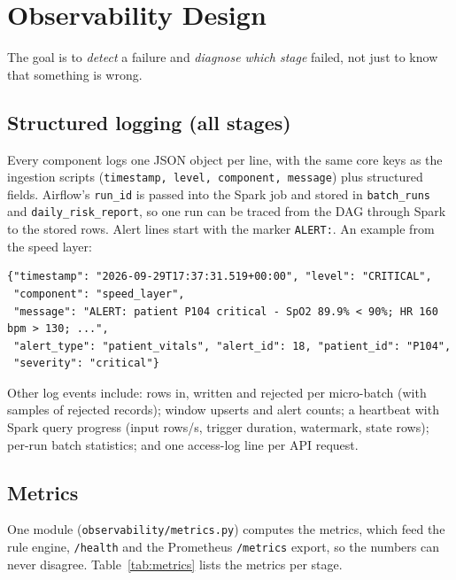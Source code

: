 \documentclass[11pt,a4paper]{article}
\newcommand{\code}[1]{\nolinkurl{#1}}
\begin{document}
\section{Observability Design}\label{sec:obs}
The goal is to \emph{detect} a failure and \emph{diagnose which stage} failed, not just to know
that something is wrong.

\subsection{Structured logging (all stages)}
Every component logs one JSON object per line, with the same core keys as the ingestion scripts
(\code{timestamp, level, component, message}) plus structured fields. Airflow's \code{run_id}
is passed into the Spark job and stored in \code{batch_runs} and \code{daily_risk_report}, so one
run can be traced from the DAG through Spark to the stored rows. Alert lines start with the
marker \code{ALERT:}. An example from the speed layer:

\begin{lstlisting}
{"timestamp": "2026-09-29T17:37:31.519+00:00", "level": "CRITICAL",
 "component": "speed_layer",
 "message": "ALERT: patient P104 critical - SpO2 89.9% < 90%; HR 160 bpm > 130; ...",
 "alert_type": "patient_vitals", "alert_id": 18, "patient_id": "P104",
 "severity": "critical"}
\end{lstlisting}

Other log events include: rows in, written and rejected per micro-batch (with samples of rejected
records); window upserts and alert counts; a heartbeat with Spark query progress (input rows/s,
trigger duration, watermark, state rows); per-run batch statistics; and one access-log line per
API request.

\subsection{Metrics}
One module (\code{observability/metrics.py}) computes the metrics, which feed the rule engine,
\code{/health} and the Prometheus \code{/metrics} export, so the numbers can never disagree.
Table~\ref{tab:metrics} lists the metrics per stage.
\end{document}
